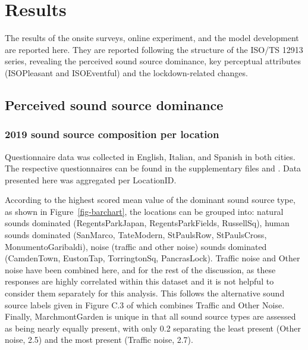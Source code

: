 \documentclass[
  authoryear,
  preprint,
  3p,
  onecolumn]{elsarticle}
\begin{document}
\hypertarget{results}{%
\section{Results}\label{results}}

The results of the onsite surveys, online experiment, and the model
development are reported here. They are reported following the structure
of the ISO/TS 12913 series, revealing the perceived sound source
dominance, key perceptual attributes (ISOPleasant and ISOEventful) and
the lockdown-related changes.

\hypertarget{perceived-sound-source-dominance}{%
\subsection{Perceived sound source
dominance}\label{perceived-sound-source-dominance}}

\hypertarget{sound-source-composition-per-location}{%
\subsubsection{2019 sound source composition per
location}\label{sound-source-composition-per-location}}

Questionnaire data was collected in English, Italian, and Spanish in
both cities. The respective questionnaires can be found in the
supplementary files and \citet{Mitchell2020Soundscape}. Data presented
here was aggregated per LocationID.

According to the highest scored mean value of the dominant sound source
type, as shown in Figure~\ref{fig-barchart}, the locations can be
grouped into: natural sounds dominated (RegentsParkJapan,
RegentsParkFields, RussellSq), human sounds dominated (SanMarco,
TateModern, StPaulsRow, StPaulsCross, MonumentoGaribaldi), noise
(traffic and other noise) sounds dominated (CamdenTown, EustonTap,
TorringtonSq, PancrasLock). Traffic noise and Other noise have been
combined here, and for the rest of the discussion, as these responses
are highly correlated within this dataset and it is not helpful to
consider them separately for this analysis. This follows the alternative
sound source labels given in Figure C.3 of \citet{ISO12913Part2} which
combines Traffic and Other Noise. Finally, MarchmontGarden is unique in
that all sound source types are assessed as being nearly equally
present, with only 0.2 separating the least present (Other noise, 2.5)
and the most present (Traffic noise, 2.7).
\end{document}
